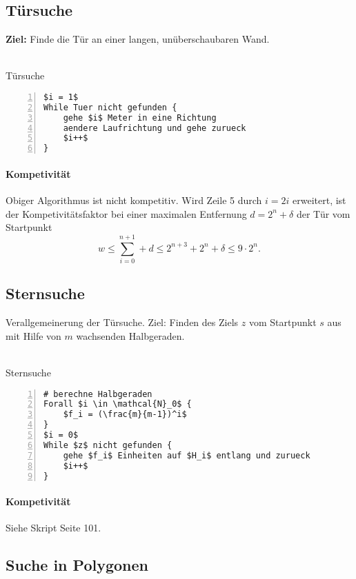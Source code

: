 \subsection{Türsuche}
\textbf{Ziel:} Finde die Tür an einer langen, unüberschaubaren Wand.
\\\\
\begin{minipage}{\textwidth}
Türsuche
\begin{lstlisting}[frame=single,numbers=left,mathescape]
$i = 1$
While Tuer nicht gefunden {
	gehe $i$ Meter in eine Richtung
	aendere Laufrichtung und gehe zurueck
	$i++$
}
\end{lstlisting}
\end{minipage}

\paragraph{Kompetivität}
Obiger Algorithmus ist nicht kompetitiv. Wird Zeile 5 durch \(i = 2i\) erweitert, ist der Kompetivitätsfaktor bei einer maximalen Entfernung \(d=2^n+\delta\) der Tür vom Startpunkt
\[w \leq \sum_{i=0}^{n+1}+d \leq 2^{n+3}+2^n+\delta \leq 9 \cdot 2^n.\]


\subsection{Sternsuche}
Verallgemeinerung der Türsuche. Ziel: Finden des Ziels \(z\) vom Startpunkt \(s\) aus mit Hilfe von \(m\) wachsenden Halbgeraden.
\\\\
\begin{minipage}{\textwidth}
Sternsuche
\begin{lstlisting}[frame=single,numbers=left,mathescape]
# berechne Halbgeraden
Forall $i \in \mathcal{N}_0$ {
	$f_i = (\frac{m}{m-1})^i$
}
$i = 0$
While $z$ nicht gefunden {
	gehe $f_i$ Einheiten auf $H_i$ entlang und zurueck
	$i++$
}
\end{lstlisting}
\end{minipage}

\paragraph{Kompetivität}
Siehe Skript Seite 101.


\subsection{Suche in Polygonen}


